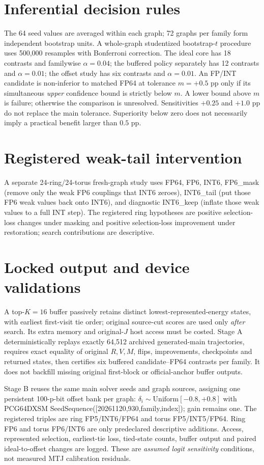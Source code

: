 \documentclass[11pt,a4paper,oneside]{report}
\begin{document}
\section{Inferential decision rules}
The 64 seed values are averaged within each graph;
72 graphs per family form independent bootstrap units.
A whole-graph studentized bootstrap-$t$ procedure
uses 500,000 resamples with Bonferroni correction.
The ideal core has 18 contrasts and familywise
$\alpha=0.04$; the buffered policy separately
has 12 contrasts and $\alpha=0.01$; the offset
study has six contrasts and $\alpha=0.01$.
An FP/INT candidate is non-inferior to matched FP64
at tolerance $m=+0.5$ pp only if its simultaneous
\emph{upper} confidence bound is strictly below $m$.
A lower bound above $m$ is failure; otherwise the
comparison is unresolved. Sensitivities $+0.25$
and $+1.0$ pp do not replace the main tolerance.
Superiority below zero does not necessarily imply
a practical benefit larger than $0.5$ pp.

\section{Registered weak-tail intervention}
A separate 24-ring/24-torus fresh-graph study
uses FP64, FP6, INT6, FP6\_mask (remove only the
weak FP6 couplings that INT6 zeroes),
INT6\_tail (put those FP6 weak values back
onto INT6), and diagnostic INT6\_keep (inflate
those weak values to a full INT step).
The registered ring hypotheses are positive
selection-loss changes under masking and positive
selection-loss improvement under restoration;
search contributions are descriptive.

\section{Locked output and device validations}
A top-$K=16$ buffer passively retains distinct
lowest-represented-energy states, with earliest
first-visit tie order; original source-cut scores
are used only \emph{after} search. Its extra
memory and original-$J$ host access must be costed.
Stage A deterministically replays exactly
64,512 archived generated-main trajectories,
requires exact equality of original $R,V,M$,
flips, improvements, checkpoints and returned
states, then certifies six buffered candidate--FP64
contrasts per family. It does not backfill missing
original first-block or official-anchor buffer outputs.

Stage B reuses the same main solver seeds and
graph sources, assigning one persistent 100-p-bit
offset bank per graph:
$\delta_i\sim\mathrm{Uniform}[-0.8,+0.8]$
with PCG64DXSM SeedSequence([20261120,930,family,index]);
gain remains one. The registered triples are
ring FP5/INT6/FP64 and torus FP5/INT5/FP64.
Ring FP6 and torus FP6/INT6 are only
predeclared descriptive additions.
Access, represented selection, earliest-tie
loss, tied-state counts, buffer output and
paired ideal-to-offset changes are logged.
These are \emph{assumed logit sensitivity}
conditions, not measured MTJ calibration residuals.
\end{document}
